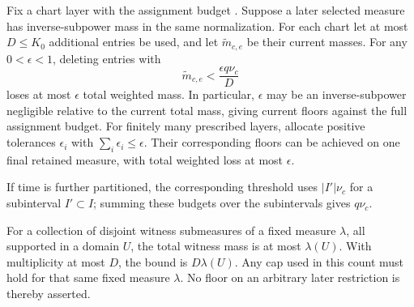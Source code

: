 \begin{lemma}
\label{a01:witness-budgets}
Fix a chart layer with the assignment budget
.  Suppose a later selected measure
has inverse-subpower mass in the same normalization.
For each chart let at most \(D\le K_0\) additional entries be
used, and let \(\widetilde m_{c,e}\) be their current masses.
For any \(0<\epsilon<1\), deleting entries with
\begin{equation}
 \widetilde m_{c,e}<\frac{\epsilon q\nu_c}{D}
 \label{a01:current-floor}
\end{equation}
loses at most \(\epsilon\) total weighted mass.
In particular, \(\epsilon\) may be an inverse-subpower
negligible relative to the current total mass, giving
current floors against the full assignment budget.
For finitely many prescribed layers, allocate positive tolerances
\(\epsilon_i\) with \(\sum_i\epsilon_i\le\epsilon\). Their
corresponding floors can be achieved on one final retained measure,
with total weighted loss at most \(\epsilon\).

If time is further partitioned, the corresponding threshold
uses \(|I'|\nu_c\) for a subinterval \(I'\subset I\);
summing these budgets over the subintervals gives \(q\nu_c\).

For a collection of disjoint witness submeasures of a fixed
measure \(\lambda\), all supported in a domain \(U\), the total
witness mass is at most \(\lambda(U)\). With multiplicity at
most \(D\), the bound is \(D\lambda(U)\). Any cap used in this
count must hold for that same fixed measure \(\lambda\).
No floor on an arbitrary later restriction is thereby asserted.
\end{lemma}

